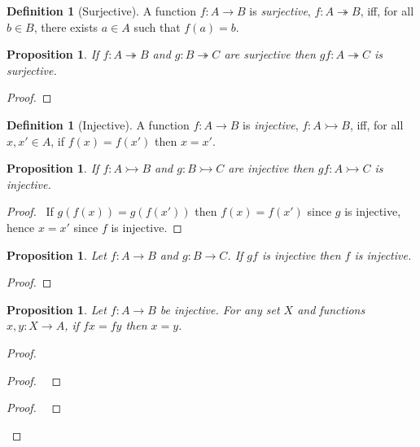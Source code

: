 \documentclass{book}
\let\qed\relax
\newtheorem{prop}[ax]{Proposition}
\theoremstyle{definition}
\newtheorem{df}[ax]{Definition}
\begin{document}
\begin{df}[Surjective]
A function $f : A \rightarrow B$ is \emph{surjective}, $f : A \twoheadrightarrow B$, iff, for all $b \in B$, there exists $a \in A$ such that $f(a) = b$.
\end{df}

\begin{prop}
If $f : A \twoheadrightarrow B$ and $g : B \twoheadrightarrow C$ are surjective then $gf : A \twoheadrightarrow C$ is surjective.
\end{prop}

\begin{proof}
\pf
{}
\qed
\end{proof}

\begin{df}[Injective]
A function $f : A \rightarrow B$ is \emph{injective},
$f : A \rightarrowtail B$, iff, for all $x, x' \in A$, if $f(x) = f(x')$ then $x = x'$.
\end{df}

\begin{prop}
If $f : A \rightarrowtail B$ and $g : B \rightarrowtail C$ are injective then $gf : A \rightarrowtail C$ is injective.
\end{prop}

\begin{proof}
\pf\ If $g(f(x)) = g(f(x'))$ then $f(x) = f(x')$ since $g$ is injective, hence $x = x'$ since $f$ is injective. \qed
\end{proof}

\begin{prop}
Let $f : A \rightarrow B$ and $g : B \rightarrow C$. If $gf$ is injective then $f$ is injective.
\end{prop}

\begin{proof}
\pf
{}
\qed
\end{proof}

\begin{prop}
Let $f : A \rightarrow B$ be injective. For any set $X$ and functions $x,y : X \rightarrow A$, if $fx = fy$ then $x = y$.
\end{prop}

\begin{proof}
\pf
{}
\begin{proof}
	\pf\ 
\end{proof}
\begin{proof}
	\pf\ 
\end{proof}
\qed
\end{proof}
\end{document}
